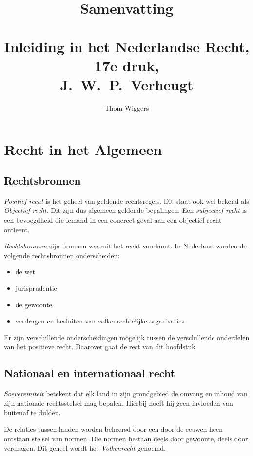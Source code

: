 \documentclass{article}
\author{Thom Wiggers}
\title{{\Huge Samenvatting}\\\ \\ Inleiding in het Nederlandse Recht, 17e druk, \\ \large J.~W.~P.~Verheugt}
\begin{document}
\maketitle

\section{Recht in het Algemeen}
\label{h1}

\subsection{Rechtsbronnen}

\emph{Positief recht} is het geheel van geldende rechtsregels. Dit staat ook
wel bekend als \emph{Objectief recht}. Dit zijn dus algemeen geldende
bepalingen. Een \emph{subjectief recht} is een bevoegdheid die iemand in een
concreet geval aan een objectief recht ontleent.

\emph{Rechtsbronnen} zijn bronnen waaruit het recht voorkomt. In Nederland
worden de volgende rechtsbronnen onderscheiden:

\begin{itemize}
  \item de wet
  \item jurisprudentie
  \item de gewoonte
  \item verdragen en besluiten van volkenrechtelijke organisaties.
\end{itemize}

Er zijn verschillende onderscheidingen mogelijk tussen de verschillende
onderdelen van het positieve recht. Daarover gaat de rest van dit hoofdstuk.

\subsection{Nationaal en internationaal recht}

\emph{Soevereiniteit} betekent dat elk land in zijn grondgebied de omvang en
inhoud van zijn nationale rechtsstelsel mag bepalen. Hierbij hoeft hij geen
invloeden van buitenaf te dulden.

De relaties tussen landen worden beheersd door een door de eeuwen heen ontstaan
stelsel van normen. Die normen bestaan deels door gewoonte, deels door
verdragen. Dit geheel wordt het \emph{Volkenrecht} genoemd.
\end{document}
